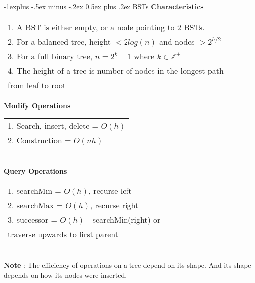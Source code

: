 \documentclass[10pt,landscape]{article}
\makeatletter
\renewcommand{\subsection}{\@startsection{subsection}{2}{0mm}%
                                {-1explus -.5ex minus -.2ex}%
                                {0.5ex plus .2ex}%
                                {\normalfont\normalsize\bfseries}}
\makeatother
\begin{document}
\begin{multicols}{3}
\subsection{BSTs}
\textbf{Characteristics}
\begin{tabular}{l}
1. A BST is either empty, or a node pointing to 2 BSTs. \\
2. For a balanced tree, height $< 2log(n)$ and nodes $> 2^{h/2}$ \\
3. For a full binary tree, $ n = 2^k - 1$ where $k \in \mathbb{Z}^{+}$ \\
4. The height of a tree is number of nodes in the longest path \\ from leaf to root \\ 
\end{tabular} 
\textbf{Modify Operations} \\
\begin{tabular}{l}
1. Search, insert, delete = $O(h)$ \\ 
2. Construction = $O(nh)$
\end{tabular} \\
\textbf{Query Operations}
\begin{tabular}{l}
1. searchMin = $O(h)$, recurse left \\
2. searchMax = $O(h)$, recurse right \\
3. successor = $O(h)$ - searchMin(right) or \\ traverse upwards to first parent 
\end{tabular} \\
\textbf{Note} : The efficiency of operations on a tree depend on its shape. And its shape depends on how its nodes were inserted. 


\end{multicols}
\end{document}
